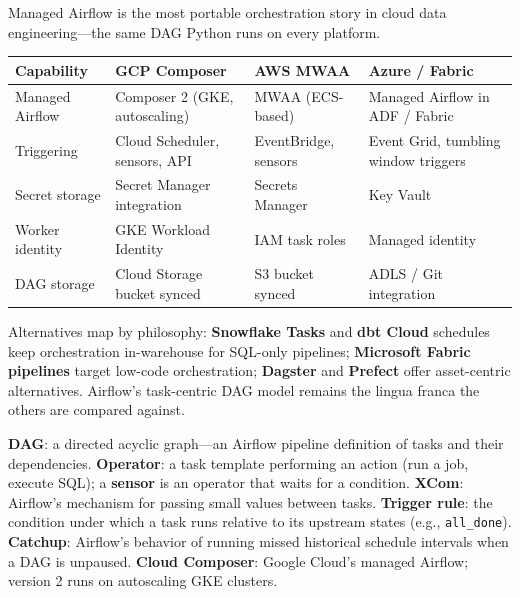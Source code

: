 \begin{crosscloud}
Managed Airflow is the most portable orchestration story in cloud data engineering---the same DAG Python runs on every platform.

\vspace{2mm}
{\footnotesize
\begin{tabular}{@{}p{2.8cm}p{3.0cm}p{3.0cm}p{3.0cm}@{}} \\
\toprule
\textbf{Capability} & \textbf{GCP Composer} & \textbf{AWS MWAA} & \textbf{Azure / Fabric} \\
\midrule
Managed Airflow & Composer 2 (GKE, autoscaling) & MWAA (ECS-based) & Managed Airflow in ADF / Fabric \\
Triggering & Cloud Scheduler, sensors, API & EventBridge, sensors & Event Grid, tumbling window triggers \\
Secret storage & Secret Manager integration & Secrets Manager & Key Vault \\
Worker identity & GKE Workload Identity & IAM task roles & Managed identity \\
DAG storage & Cloud Storage bucket synced & S3 bucket synced & ADLS / Git integration \\
\bottomrule
\end{tabular}}

\vspace{1mm}
Alternatives map by philosophy: \textbf{Snowflake Tasks} and \textbf{dbt Cloud} schedules keep orchestration in-warehouse for SQL-only pipelines; \textbf{Microsoft Fabric pipelines} target low-code orchestration; \textbf{Dagster} and \textbf{Prefect} offer asset-centric alternatives. Airflow's task-centric DAG model remains the lingua franca the others are compared against.
\end{crosscloud}

\begin{keyterms}
\textbf{DAG}: a directed acyclic graph---an Airflow pipeline definition of tasks and their dependencies.
\textbf{Operator}: a task template performing an action (run a job, execute SQL); a \textbf{sensor} is an operator that waits for a condition.
\textbf{XCom}: Airflow's mechanism for passing small values between tasks.
\textbf{Trigger rule}: the condition under which a task runs relative to its upstream states (e.g., \texttt{all\_done}).
\textbf{Catchup}: Airflow's behavior of running missed historical schedule intervals when a DAG is unpaused.
\textbf{Cloud Composer}: Google Cloud's managed Airflow; version 2 runs on autoscaling GKE clusters.
\end{keyterms}

